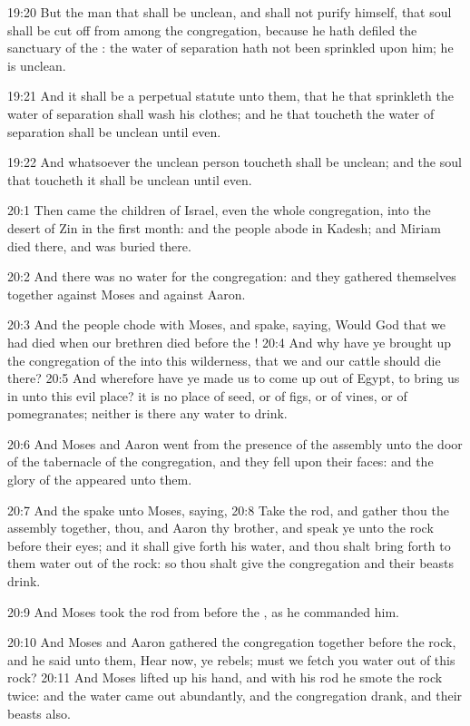19:20 But the man that shall be unclean, and shall not purify himself, that soul shall be cut off from among the congregation, because he hath defiled the sanctuary of the \LORD: the water of separation hath not been sprinkled upon him; he is unclean.

19:21 And it shall be a perpetual statute unto them, that he that sprinkleth the water of separation shall wash his clothes; and he that toucheth the water of separation shall be unclean until even.

19:22 And whatsoever the unclean person toucheth shall be unclean; and the soul that toucheth it shall be unclean until even.

20:1 Then came the children of Israel, even the whole congregation, into the desert of Zin in the first month: and the people abode in Kadesh; and Miriam died there, and was buried there.

20:2 And there was no water for the congregation: and they gathered themselves together against Moses and against Aaron.

20:3 And the people chode with Moses, and spake, saying, Would God that we had died when our brethren died before the \LORD!  20:4 And why have ye brought up the congregation of the \LORD into this wilderness, that we and our cattle should die there?  20:5 And wherefore have ye made us to come up out of Egypt, to bring us in unto this evil place?  it is no place of seed, or of figs, or of vines, or of pomegranates; neither is there any water to drink.

20:6 And Moses and Aaron went from the presence of the assembly unto the door of the tabernacle of the congregation, and they fell upon their faces: and the glory of the \LORD appeared unto them.

20:7 And the \LORD spake unto Moses, saying, 20:8 Take the rod, and gather thou the assembly together, thou, and Aaron thy brother, and speak ye unto the rock before their eyes; and it shall give forth his water, and thou shalt bring forth to them water out of the rock: so thou shalt give the congregation and their beasts drink.

20:9 And Moses took the rod from before the \LORD, as he commanded him.

20:10 And Moses and Aaron gathered the congregation together before the rock, and he said unto them, Hear now, ye rebels; must we fetch you water out of this rock?  20:11 And Moses lifted up his hand, and with his rod he smote the rock twice: and the water came out abundantly, and the congregation drank, and their beasts also.

